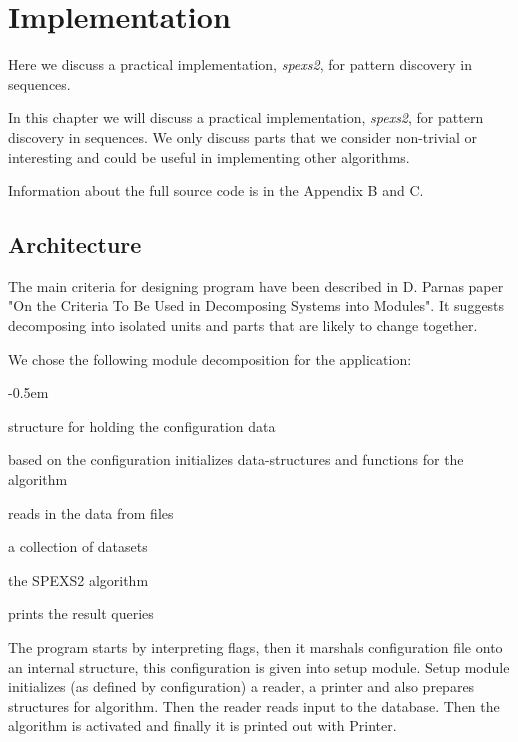 \chapter{Implementation}

Here we discuss a practical implementation, \emph{spexs2}, for
pattern discovery in sequences. 

In this chapter we will discuss a practical implementation, \emph{spexs2}, for pattern discovery in sequences. We only discuss parts that we consider non-trivial or interesting and could be useful in implementing other algorithms.

Information about the full source code is in the Appendix B and C.

\section{Architecture}

The main criteria for designing program have been described in D. Parnas
paper "On the Criteria To Be Used in Decomposing Systems into Modules"\cite{Parnas72}. It suggests decomposing into isolated units and parts that are likely to change together.

We chose the following module decomposition for the application:

\begin{small}
\begin{description}
    \itemsep-0.5em
    \item[Configuration] structure for holding the configuration data
    \item[Setup] based on the configuration initializes data-structures and functions for the algorithm
    \item[Reader] reads in the data from files
    \item[Database] a collection of datasets
    \item[Algorithm] the SPEXS2 algorithm
    \item[Printer] prints the result queries
\end{description}
\end{small}

The program starts by interpreting flags, then it marshals configuration file onto an internal structure, this configuration is given into setup module. Setup module initializes (as defined by configuration) a reader, a printer and also prepares structures for algorithm. Then the reader reads input to the database. Then the algorithm is activated and finally it is printed out with Printer.

